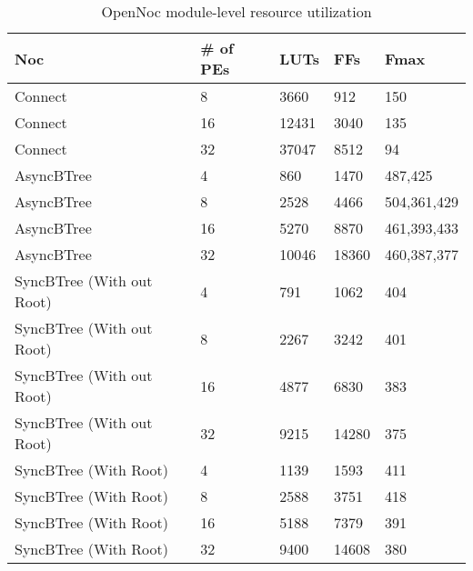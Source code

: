\begin{table}[!t]
  \centering
  \caption{OpenNoc module-level resource utilization} 
  \begin{tabular}{l|l|l|l|l}
      \toprule
      Noc & \# of PEs & LUTs & FFs & Fmax \\
      \midrule
      \midrule
      Connect & 8      & 3660 & 912 & 150  \\
      Connect & 16     & 12431 & 3040 & 135 \\
      Connect & 32     & 37047 & 8512 & 94 \\    
      \midrule
      AsyncBTree & 4         & 860  & 1470 & 487,425\\
      AsyncBTree & 8         & 2528 & 4466 & 504,361,429\\
      AsyncBTree & 16        & 5270 & 8870 & 461,393,433 \\
      AsyncBTree & 32        & 10046 & 18360 & 460,387,377\\
      \midrule
      SyncBTree (With out Root) &  4         &  791 & 1062 & 404\\
      SyncBTree (With out Root) &  8         &  2267 & 3242 & 401\\
      SyncBTree (With out Root) &  16        &  4877 & 6830 & 383\\
      SyncBTree (With out Root) &  32        &  9215 & 14280 & 375\\
      \midrule      
      SyncBTree (With Root) &  4         &  1139 & 1593 & 411\\
      SyncBTree (With Root) &  8         &  2588 & 3751 & 418\\
      SyncBTree (With Root) &  16         &  5188 & 7379 & 391\\ 
      SyncBTree (With Root) &  32         &  9400 & 14608 & 380\\ 
      \bottomrule
    \end{tabular}
	\label{table:systemResourceConsumption}
\end{table}